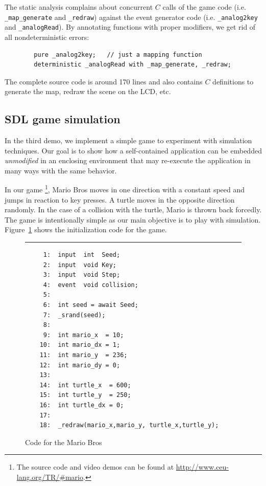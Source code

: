 \documentclass[11pt,a4paper]{article}
\newcommand{\2}{\;\;}
\newcommand{\5}{\;\;\;\;\;}
\newcommand{\code}[1] {{\small{\texttt{#1}}}}
\begin{document}
The static analysis complains about concurrent $C$ calls of the game code (i.e.  
\code{\_map\_generate} and \code{\_redraw}) against the event generator code 
(i.e. \code{\_analog2key} and \code{\_analogRead}).
By annotating functions with proper modifiers, we get rid of all 
nondeterministic errors:

{\small
\begin{verbatim}
        pure _analog2key;   // just a mapping function
        deterministic _analogRead with _map_generate, _redraw;
\end{verbatim}
}

The complete source code is around 170 lines and also contains $C$ definitions 
to generate the map, redraw the scene on the LCD, etc.

\subsection{SDL game simulation}

In the third demo, we implement a simple game to experiment with simulation 
techniques.
Our goal is to show how a self-contained application can be embedded 
\emph{unmodified} in an enclosing environment that may re-execute the 
application in many ways with the same behavior.

In our game%
\footnote{The source code and video demos can be found at 
\url{http://www.ceu-lang.org/TR/\#mario}.}, Mario Bros moves in one direction 
with a constant speed and jumps in reaction to key presses.
A turtle moves in the opposite direction randomly.
In the case of a collision with the turtle, Mario is thrown back forcedly.
The game is intentionally simple as our main objective is to play with 
simulation.
Figure~\ref{lst:demos:mario:1} shows the initialization code for the game.

\begin{figure}[h!]
\rule{15cm}{0.37pt}
{\small
\begin{verbatim}
     1:  input  int  Seed;
     2:  input  void Key;
     3:  input  void Step;
     4:  event  void collision;
     5:
     6:  int seed = await Seed;
     7:  _srand(seed);
     8:
     9:  int mario_x  = 10;
    10:  int mario_dx = 1;
    11:  int mario_y  = 236;
    12:  int mario_dy = 0;
    13:
    14:  int turtle_x  = 600;
    15:  int turtle_y  = 250;
    16:  int turtle_dx = 0;
    17:
    18:  _redraw(mario_x,mario_y, turtle_x,turtle_y);
\end{verbatim}
}
\caption{ Code for the Mario Bros
\label{lst:demos:mario:1}
}
\end{figure}
\end{document}
